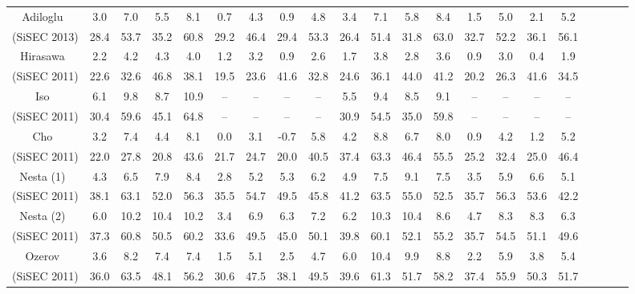 \documentclass{article}
\begin{document}
\begin{table*}[t]
\begin{center}
{\begin{tabular}{|c|cccc|cccc|cccc|cccc|cccc|}
			\multirow{1}{*}{Adiloglu~\cite{Adiloglu}}		&	3.0	&	7.0	&	5.5	&	8.1			&	0.7	&	4.3	&	0.9	&	4.8			&	3.4	&	7.1	&	5.8	&	8.4		&	1.5	&	5.0	&	2.1	&	5.2	\\
			\multirow{1}{*}{(SiSEC 2013)}			&	28.4	&	53.7	&	35.2	&	60.8			&	29.2	&	46.4	&	29.4	&	53.3			&	26.4	&	51.4	&	31.8	&	63.0		&	32.7	&	52.2	&	36.1	&	56.1	\\ \hline
			\multirow{1}{*}{Hirasawa~\cite{Hirasawa}}	&	2.2	&	4.2	&	4.3	&	4.0			&	1.2	&	3.2	&	0.9	&	2.6			&	1.7	&	3.8	&	2.8	&	3.6		&	0.9	&	3.0	&	0.4	&	1.9	\\
			\multirow{1}{*}{(SiSEC 2011)}			&	22.6	&	32.6	&	46.8	&	38.1			&	19.5	&	23.6	&	41.6	&	32.8			&	24.6	&	36.1	&	44.0	&	41.2		&	20.2	&	26.3	&	41.6	&	34.5	\\ \hline
			\multirow{1}{*}{Iso~\cite{Iso}}				&	6.1	&	9.8	&	8.7	&	10.9			&	--	&	--	&	--	&	--			&	5.5	&	9.4	&	8.5	&	9.1		&	--	&	--	&	--	&	--	\\
			\multirow{1}{*}{(SiSEC 2011)}			&	30.4	&	59.6	&	45.1	&	64.8			&	--	&	--	&	--	&	--			&	30.9	&	54.5	&	35.0	&	59.8		&	--	&	--	&	--	&	--	\\ \hline
			\multirow{1}{*}{Cho~\cite{Cho2}}			&	3.2	&	7.4	&	4.4	&	8.1			&	0.0	&	3.1	&	-0.7	&	5.8			&	4.2	&	8.8	&	6.7	&	8.0		&	0.9	&	4.2	&	1.2	&	5.2	\\
			\multirow{1}{*}{(SiSEC 2011)}			&	22.0	&	27.8	&	20.8	&	43.6			&	21.7	&	24.7	&	20.0	&	40.5			&	37.4	&	63.3	&	46.4	&	55.5		&	25.2	&	32.4	&	25.0	&	46.4	\\ \hline
			\multirow{1}{*}{Nesta (1)~\cite{Nesta}}	&	4.3	&	6.5	&	7.9	&	8.4			&	2.8	&	5.2	&	5.3	&	6.2			&	4.9	&	7.5	&	9.1	&	7.5		&	3.5	&	5.9	&	6.6	&	5.1	\\
			\multirow{1}{*}{(SiSEC 2011)}			&	38.1	&	63.1	&	52.0	&	56.3			&	35.5	&	54.7	&	49.5	&	45.8			&	41.2	&	63.5	&	55.0	&	52.5		&	35.7	&	56.3	&	53.6	&	42.2	\\ \hline
			\multirow{1}{*}{Nesta (2)~\cite{Nesta}}	&	6.0	&	10.2	&	10.4	&	10.2			&	3.4	&	6.9	&	6.3	&	7.2			&	6.2	&	10.3	&	10.4	&	8.6		&	4.7	&	8.3	&	8.3	&	6.3	\\
			\multirow{1}{*}{(SiSEC 2011)}			&	37.3	&	60.8	&	50.5	&	60.2			&	33.6	&	49.5	&	45.0	&	50.1			&	39.8	&	60.1	&	52.1	&	55.2		&	35.7	&	54.5	&	51.1	&	49.6	\\ \hline
			\multirow{1}{*}{Ozerov~\cite{Ozerov}}		&	3.6	&	8.2	&	7.4	&	7.4			&	1.5	&	5.1	&	2.5	&	4.7			&	6.0	&	10.4	&	9.9	&	8.8		&	2.2	&	5.9	&	3.8	&	5.4	\\
			\multirow{1}{*}{(SiSEC 2011)}			&	36.0	&	63.5	&	48.1	&	56.2			&	30.6	&	47.5	&	38.1	&	49.5			&	39.6	&	61.3	&	51.7	&	58.2		&	37.4	&	55.9	&	50.3	&	51.7	\\ \hline
		\end{tabular}
	}
	\end{center}
	\label{UND-test-250ms-1m}
\end{table*}
\end{document}
